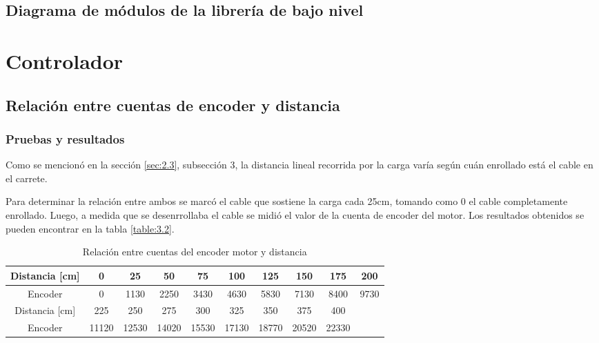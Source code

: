 \subsection{Diagrama de módulos de la librería de bajo nivel}


\section{Controlador} \label{sec:\thesection}

\subsection{Relación entre cuentas de encoder y distancia}
\subsubsection{Pruebas y resultados}
Como se mencionó en la sección \ref{sec:2.3}, subsección 3, la distancia lineal recorrida por la carga varía según cuán enrollado está el cable en el carrete. 

Para determinar la relación entre ambos se marcó el cable que sostiene la carga cada 25cm, tomando como 0 el cable completamente enrollado. Luego, a medida que se desenrrollaba el cable se midió el valor de la cuenta de encoder del motor. Los resultados obtenidos se pueden encontrar en la tabla \ref{table:3.2}.

\begin{table}[!ht]
	\begin{center}
		\begin{tabular}{|c|c|c|c|c|c|c|c|c|c|}
			\hline
			Distancia [cm] & 0 & 25 & 50 & 75 & 100 & 125 & 150 & 175 & 200  \\
			\hline
			Encoder & 0 & 1130 & 2250 & 3430 & 4630 & 5830 & 7130 & 8400 & 9730 \\
			\hline \hline
			Distancia [cm]  & 225 & 250 & 275 & 300 & 325 & 350 & 375 & 400 & \\
			\hline
			Encoder  & 11120 & 12530 & 14020 & 15530 & 17130 & 18770 & 20520 & 22330 & \\ 
			\hline
		\end{tabular}
	\end{center}
	\caption{Relación entre cuentas del encoder motor y distancia}
	\label{table:\thetable}
\end{table}

